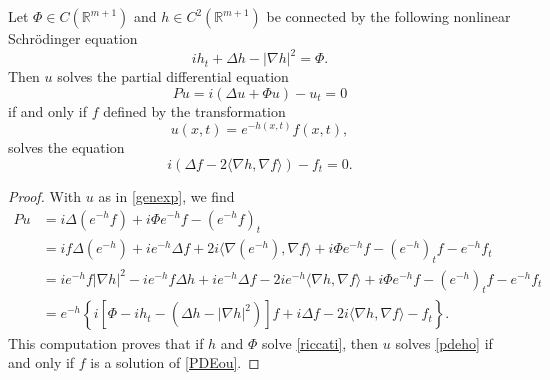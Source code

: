 \documentclass[10pt,a4paper]{amsart}
\def \R {\mathbb{R}}
\begin{document}
\begin{lemma}\label{L:ouho}
Let $\Phi\in C(\R^{m+1})$ and $h\in C^2(\R^{m+1})$ be connected by the following  nonlinear Schr\"odinger equation
\begin{equation}\label{riccati}
i h_t + \Delta h - |\nabla h|^2  = \Phi.
\end{equation}
Then $u$ solves the partial differential equation
\begin{equation}\label{pdeho}
P u = i(\Delta u + \Phi u) - u_t = 0
\end{equation}
if and only if $f$ defined by the transformation
\begin{equation}\label{genexp}
u(x,t) = e^{-h(x,t)} f(x,t),
\end{equation} 
solves the equation
\begin{equation}\label{PDEou}
i(\Delta f - 2 \langle\nabla h,\nabla f\rangle) - f_t = 0.
\end{equation}
\end{lemma}

\begin{proof}
With $u$ as in \eqref{genexp}, we find
\begin{align*}
P u & = i \Delta(e^{-h} f) + i \Phi e^{-h} f - (e^{-h} f)_t
\\
& = i f \Delta(e^{-h}) + i e^{-h} \Delta f + 2 i \langle\nabla(e^{-h}),\nabla f\rangle + i \Phi e^{-h} f
 - (e^{-h})_t f -  e^{-h} f_t
\\
& = i e^{-h} f |\nabla h|^2 - i e^{-h} f \Delta h + i e^{-h} \Delta f - 2 i e^{-h} \langle\nabla h,\nabla f\rangle + i \Phi e^{-h} f
 - (e^{-h})_t f -  e^{-h} f_t
 \\
 & = e^{-h}\left\{i \left[\Phi - i h_t - (\Delta h - |\nabla h|^2 )\right] f + i \Delta f - 2 i \langle\nabla h,\nabla f\rangle - f_t\right\}.
\end{align*}
This computation proves that if $h$ and $\Phi$ solve \eqref{riccati}, then $u$ solves \eqref{pdeho} if and only if $f$ is a solution of \eqref{PDEou}.


\end{proof}
\end{document}
